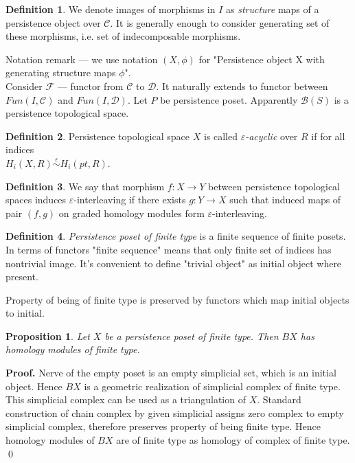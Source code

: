 \documentclass[a4paper, 12pt]{article}
\newtheorem{proposition}{Proposition}
\theoremstyle{definition}
\newtheorem{definition}{Definition}
\theoremstyle{remark}
\newenvironment{pf}{\noindent\textbf{Proof.}}{\qed}
\newcommand{\define}[1]{{\textit{#1}}}
\begin{document}
\begin{definition}
  We denote images of morphisms in $I$ as \define{structure} maps of a persistence object over $\mathcal{C}$. It is generally enough to consider generating set of these morphisms, i.e. set of indecomposable morphisms.
\end{definition}

Notation remark --- we use notation $(X,\phi)$ for "Persistence object X with generating structure maps $\phi$".\\

Consider $\mathcal{F}$ --- functor from $\mathcal{C}$ to $\mathcal{D}$. It naturally extends to functor between $Fun(I,\mathcal{C})$ and $Fun(I,\mathcal{D})$. Let $P$ be persistence poset. Apparently $\mathcal{B}(S)$ is a persistence topological space.\\

\begin{definition}
  Persistence topological space $X$ is called \define{$\varepsilon$-acyclic} over $R$ if for all indices\\ $H_i(X,R) \stackrel{\varepsilon}{\sim} H_i(pt,R)$.
\end{definition}

\begin{definition}
  We say that morphism $f : X \to Y$ between persistence topological spaces induces $\varepsilon$-interleaving if there exists $g : Y \to X$ such that induced maps of pair $(f,g)$ on graded homology modules form $\varepsilon$-interleaving.
\end{definition}

\begin{definition}
  \define{Persistence poset of finite type} is a finite sequence of finite posets.\\

  In terms of functors "finite sequence" means that only finite set of indices has nontrivial image. It's convenient to define "trivial object" as initial object where present.
\end{definition}

Property of being of finite type is preserved by functors which map initial objects to initial.\\

\begin{proposition}
  Let $X$ be a persistence poset of finite type. Then $BX$ has homology modules of finite type.
\end{proposition}

\begin{pf}
  Nerve of the empty poset is an empty simplicial set, which is an initial object. Hence $BX$ is a geometric realization of simplicial complex of finite type. This simplicial complex can be used as a triangulation of $X$. Standard construction of chain complex by given simplicial assigns zero complex to empty simplicial complex, therefore preserves property of being finite type. Hence homology modules of $BX$ are of finite type as homology of complex of finite type.
\end{pf}\\
\end{document}
